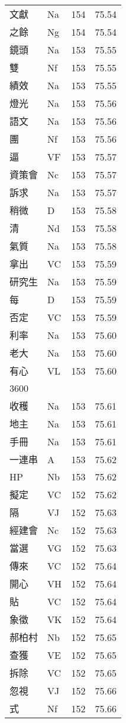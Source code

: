 \documentclass[twocolumn]{book}
\begin{document}
\begin{supertabular}{llrr}
文獻 & Na & 154 &  75.54\\
之餘 & Ng & 154 &  75.54\\
鏡頭 & Na & 153 &  75.55\\
雙 & Nf & 153 &  75.55\\
績效 & Na & 153 &  75.55\\
燈光 & Na & 153 &  75.56\\
語文 & Na & 153 &  75.56\\
團 & Nf & 153 &  75.56\\
逼 & VF & 153 &  75.57\\
資策會 & Nc & 153 &  75.57\\
訴求 & Na & 153 &  75.57\\
稍微 & D & 153 &  75.58\\
清 & Nd & 153 &  75.58\\
氣質 & Na & 153 &  75.58\\
拿出 & VC & 153 &  75.59\\
研究生 & Na & 153 &  75.59\\
每 & D & 153 &  75.59\\
否定 & VC & 153 &  75.59\\
利率 & Na & 153 &  75.60\\
老大 & Na & 153 &  75.60\\
有心 & VL & 153 &  75.60\\
3600\\
收穫 & Na & 153 &  75.61\\
地主 & Na & 153 &  75.61\\
手冊 & Na & 153 &  75.61\\
一連串 & A & 153 &  75.62\\
HP & Nb & 153 &  75.62\\
擬定 & VC & 152 &  75.62\\
隔 & VJ & 152 &  75.63\\
經建會 & Nc & 152 &  75.63\\
當選 & VG & 152 &  75.63\\
傳來 & VC & 152 &  75.64\\
開心 & VH & 152 &  75.64\\
貼 & VC & 152 &  75.64\\
象徵 & VK & 152 &  75.64\\
郝柏村 & Nb & 152 &  75.65\\
查獲 & VE & 152 &  75.65\\
拆除 & VC & 152 &  75.65\\
忽視 & VJ & 152 &  75.66\\
式 & Nf & 152 &  75.66\\

\end{supertabular}
\end{document}
